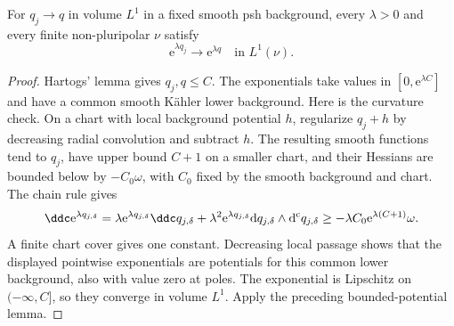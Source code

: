 \begin{corollary}\label{cor:exponential-psh-measure-continuity}
For $q_j\to q$ in volume $L^1$ in a fixed smooth psh background, every $\lambda>0$ and every finite non-pluripolar $\nu$ satisfy
\[
 \mathrm e^{\lambda q_j}\longrightarrow\mathrm e^{\lambda q}
                                  \quad\text{in }L^1(\nu).
\]
\end{corollary}
\begin{proof}
Hartogs' lemma gives $q_j,q\leq C$. The exponentials take values in $[0,\mathrm e^{\lambda C}]$ and have a common smooth K\"ahler lower background. Here is the curvature check. On a chart with local background potential $h$, regularize $q_j+h$ by decreasing radial convolution and subtract $h$. The resulting smooth functions tend to $q_j$, have upper bound $C+1$ on a smaller chart, and their Hessians are bounded below by $-C_0\omega$, with $C_0$ fixed by the smooth background and chart. The chain rule gives
\[
 \ddc\mathrm e^{\lambda q_{j,\delta}}
   =\lambda\mathrm e^{\lambda q_{j,\delta}}\ddc q_{j,\delta}
      +\lambda^2\mathrm e^{\lambda q_{j,\delta}}
             \mathrm dq_{j,\delta}\wedge\mathrm d^{\mathrm c}q_{j,\delta}
   \geq-\lambda C_0\mathrm e^{\lambda(C+1)}\omega.
\]
A finite chart cover gives one constant. Decreasing local passage shows that the displayed pointwise exponentials are potentials for this common lower background, also with value zero at poles. The exponential is Lipschitz on $(-\infty,C]$, so they converge in volume $L^1$. Apply the preceding bounded-potential lemma.
\end{proof}

